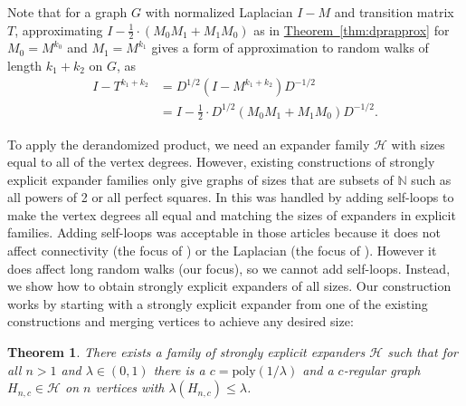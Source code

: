 \documentclass[11pt]{article}
\numberwithin{equation}{section}
\newtheorem{theorem}{Theorem}[section]
\theoremstyle{definition}
\theoremstyle{plain}
\newcommand{\expref}[2]{\hyperref[#2]{#1~\ref{#2}}}
\numberwithin{myalgctr}{section}
\theoremstyle{named}
\begin{document}
Note that for a graph $G$ with normalized Laplacian $I-M$ and transition matrix $T$, approximating $I-\frac{1}{2}\cdot(M_0M_1+M_1M_0)$ as in \expref{Theorem}{thm:dprapprox} for $M_0=M^{k_0}$ and $M_1=M^{k_1}$ gives a form of approximation to random walks of length $k_1+k_2$ on $G$, as 
\begin{align*}
I-T^{k_1+k_2} &= D^{1/2}(I-M^{k_1+k_2})D^{-1/2} \\
&=I-\frac{1}{2}\cdot D^{1/2}(M_0M_1+M_1M_0)D^{-1/2}.
\end{align*}

To apply the derandomized product, we need an expander family $\mathcal{H}$ with sizes equal to all of the vertex degrees. However, existing constructions of strongly explicit expander families only give graphs of sizes that are subsets of $\mathbb{N}$ such as all powers of 2 or all perfect squares. In \cite{RozenmanVa05, derandbeyond2017} this was handled by adding self-loops to make the vertex degrees all equal and matching the sizes of expanders in explicit families. Adding self-loops was acceptable in those
%
articles  %
because it does not affect connectivity (the focus of \cite{RozenmanVa05}) or the Laplacian (the focus of \cite{derandbeyond2017}). However it does affect long random walks (our focus), so we cannot add self-loops. Instead, we show how to obtain strongly explicit expanders of all sizes. Our construction works by starting with a strongly explicit expander from one of the existing constructions and merging vertices to achieve any desired size: 

\begin{theorem}
\label{thm:expanders}
There exists a family of strongly explicit expanders $\mathcal{H}$ such that for all $n>1$ and $\lambda\in(0,1)$ there is a $c=\mathrm{poly}(1/\lambda)$ and a $c$-regular graph $H_{n,c}\in \mathcal{H}$ on $n$ vertices with $\lambda(H_{n,c})\leq \lambda$.
\end{theorem}
\end{document}
